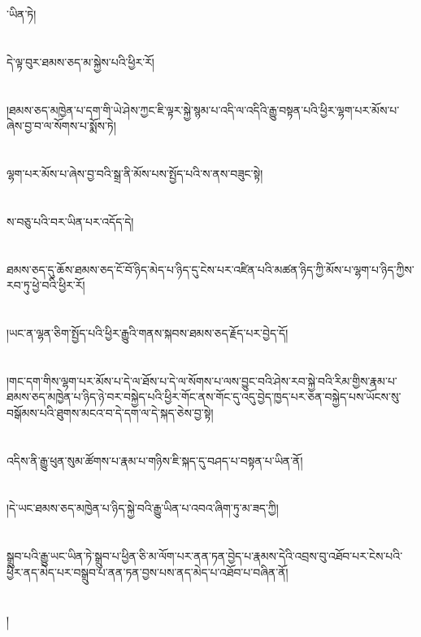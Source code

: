 ་ཡིན་ཏེ།\chapter{ }དེ་ལྟ་བུར་ཐམས་ཅད་མ་སྐྱེས་པའི་ཕྱིར་རོ།\chapter{ }།ཐམས་ཅད་མཁྱེན་པ་དག་གི་ཡེ་ཤེས་ཀྱང་ཇི་ལྟར་སྐྱེ་སྙམ་པ་འདི་ལ་འདིའི་རྒྱུ་བསྟན་པའི་ཕྱིར་ལྷག་པར་མོས་པ་ཞེས་བྱ་བ་ལ་སོགས་པ་སྨོས་ཏེ།\chapter{ }ལྷག་པར་མོས་པ་ཞེས་བྱ་བའི་སྒྲ་ནི་མོས་པས་སྤྱོད་པའི་ས་ནས་བཟུང་སྟེ།\chapter{ }ས་བཅུ་པའི་བར་ཡིན་པར་འདོད་དེ།\chapter{ }ཐམས་ཅད་དུ་ཆོས་ཐམས་ཅད་ངོ་བོ་ཉིད་མེད་པ་ཉིད་དུ་ངེས་པར་འཛིན་པའི་མཚན་ཉིད་ཀྱི་མོས་པ་ལྷག་པ་ཉིད་ཀྱིས་རབ་ཏུ་ཕྱེ་བའི་ཕྱིར་རོ།\chapter{ }།ཡང་ན་ལྷན་ཅིག་སྤྱོད་པའི་ཕྱིར་རྒྱུའི་གནས་སྐབས་ཐམས་ཅད་རྗོད་པར་བྱེད་དོ།\chapter{ }།གང་དག་གིས་ལྷག་པར་མོས་པ་དེ་ལ་ཐོས་པ་དེ་ལ་སོགས་པ་ལས་བྱུང་བའི་ཤེས་རབ་སྐྱེ་བའི་རིམ་གྱིས་རྣམ་པ་ཐམས་ཅད་མཁྱེན་པ་ཉིད་ཉེ་བར་བསྐྱེད་པའི་ཕྱིར་གོང་ནས་གོང་དུ་འདུ་བྱེད་ཁྱད་པར་ཅན་བསྐྱེད་པས་ཡོངས་སུ་བསྒོམས་པའི་ཐུགས་མངའ་བ་དེ་དག་ལ་དེ་སྐད་ཅེས་བྱ་སྟེ།\chapter{ }འདིས་ནི་རྒྱུ་ཕུན་སུམ་ཚོགས་པ་རྣམ་པ་གཉིས་ཇི་སྐད་དུ་བཤད་པ་བསྟན་པ་ཡིན་ནོ།\chapter{ }།དེ་ཡང་ཐམས་ཅད་མཁྱེན་པ་ཉིད་སྐྱེ་བའི་རྒྱུ་ཡིན་པ་འབའ་ཞིག་ཏུ་མ་ཟད་ཀྱི།\chapter{ }སྒྲུབ་པའི་རྒྱུ་ཡང་ཡིན་ཏེ་སྒྲུབ་པ་ཕྱིན་ཅི་མ་ལོག་པར་ནན་ཏན་བྱེད་པ་རྣམས་དེའི་འབྲས་བུ་འཐོབ་པར་ངེས་པའི་ཕྱིར་ནད་མེད་པར་བསྒྲུབ་པ་ནན་ཏན་བྱས་པས་ནད་མེད་པ་འཐོབ་པ་བཞིན་ནོ།\chapter{ }།
